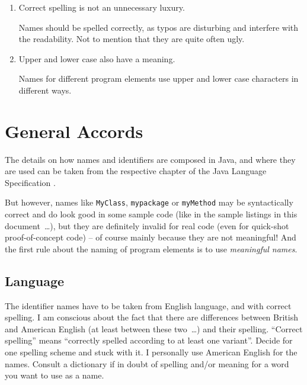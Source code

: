 \documentclass[11pt,a4paper, titlepage, parskip=half, headsepline, footsepline, cleardoublepage=current, headheight=1cm]{scrbook}
\begin{document}
\begin{enumerate}[label=P\arabic*.]
{This is particularly important for the names of local variables and for the formal parameters of a method or a constructor; it means that the same thing should always get the same name.}

\item{Correct spelling is not an unnecessary luxury.

Names should be spelled correctly, as typos are disturbing and interfere with the readability. Not to mention that they are quite often ugly.}

\item{Upper and lower case also have a meaning.

Names for different program elements use upper and lower case characters in different ways.}
\end{enumerate}


\section{General Accords}
The details on how names and identifiers are composed in Java, and where they are used can be taken from the respective chapter of the Java Language Specification \autocite{ORACLE_DOC_LANGUAGE_SPECIFICATION:NamesAndIdentifiers}.

But however, names like \lstinline|MyClass|, \lstinline|mypackage| or \lstinline|myMethod| may be syntactically correct and do look good in some sample code (like in the sample listings in this document~…), but they are definitely invalid for real code (even for quick-shot proof-of-concept code) – of course mainly because they are not meaningful! And the first rule about the naming of program elements is to use \textit{meaningful names}. 


\subsection{Language}
The identifier names have to be taken from English language, and with correct spelling. I am conscious about the fact that there are differences between British and American English (at least between these two~…) and their spelling. “Correct spelling” means “correctly spelled according to at least one variant”. Decide for one spelling scheme and stuck with it. I personally use American English for the names. Consult a dictionary if in doubt of spelling and/or meaning for a word you want to use as a name.
\end{document}

